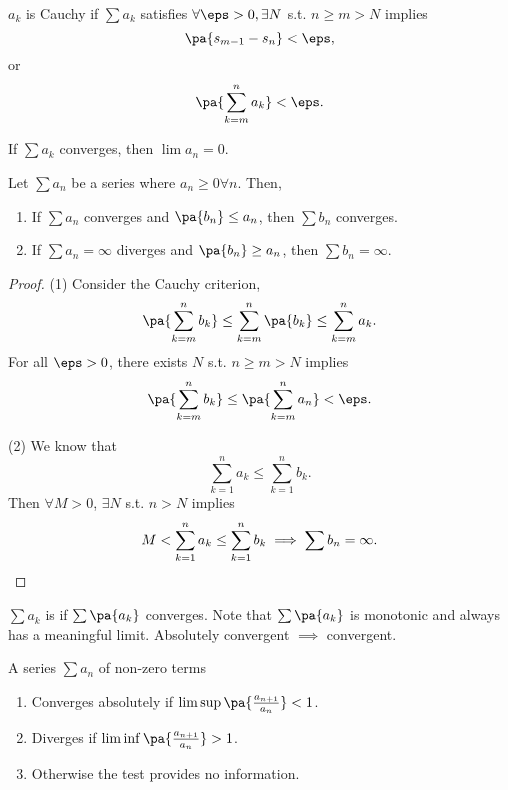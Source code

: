 \documentclass[11pt]{scrartcl}
\numberwithin{equation}{section}
\begin{document}
\begin{proposition}
    $a_k$ is Cauchy if
    $\sum a_k$ satisfies $\forall \eps>0, \exists N$ s.t.
    $n \geq m>N$ implies \[ \pa{s_{m-1}-s_n} < 
    \eps,\]
    or 
    \[
        \pa{\sum_{k=m}^{n}a_k} < \eps. 
    \]
\end{proposition}

\begin{corollary}
    If $\sum a_k$ converges, then $\lim a_n=0$.
\end{corollary}

\begin{proposition}
    \label{prop:comptest}
    Let $\sum a_n$ be a series where $a_n\geq 0\forall n$. Then, 
    \begin{enumerate}
        \item If $\sum a_n$ converges  and $\pa{b_n}\leq a_n$, then 
        $\sum b_n$ converges.
        \item If $\sum a_n=\infty$ diverges and $\pa{b_n}\geq a_n$, then 
        $\sum b_n = \infty$.
    \end{enumerate}
\end{proposition}
\begin{proof}
    (1) Consider the Cauchy criterion,
    \[ \pa{\sum_{k=m}^{n}b_k} \leq \sum_{k=m}^{n}\pa{b_k} 
    \leq \sum_{k=m}^{n}a_k.\]
    For all $\eps>0$, there exists $N$ s.t. $n\geq m > N$ implies 
    \[ \pa{\sum_{k=m}^{n}b_k} \leq \pa{\sum_{k=m}^{n}a_n}< \eps.\]

    (2) We know that 
    \[ \sum_{k=1}^{n}a_k \leq \sum_{k=1}^{n}b_k.\]
    Then $\forall M>0$, $\exists N$ s.t. $n>N$ implies
    \[ M < \sum_{k=1}^{n} a_k \leq \sum_{k=1}^{n} b_k  \implies \sum b_n = \infty.
    \qedhere \]
\end{proof}
\begin{definition}
    $\sum a_k$ is  if $\sum \pa{a_k}$ converges.
    Note that $\sum \pa{a_k}$ is monotonic and always has a meaningful
    limit. Absolutely convergent $\implies$ convergent.
\end{definition}
\begin{proposition}
    \label{prop:ratiotest}
    A series $\sum a_n$ of non-zero terms 
    \begin{enumerate}
        \item Converges absolutely if $\limsup \pa{\frac{a_{n+1}}{{a_n}}} < 1$.
        \item Diverges if $\liminf \pa{\frac{a_{n+1}}{{a_n}}} > 1$.
        \item Otherwise the test provides no information.
    \end{enumerate}
\end{proposition}
\end{document}
